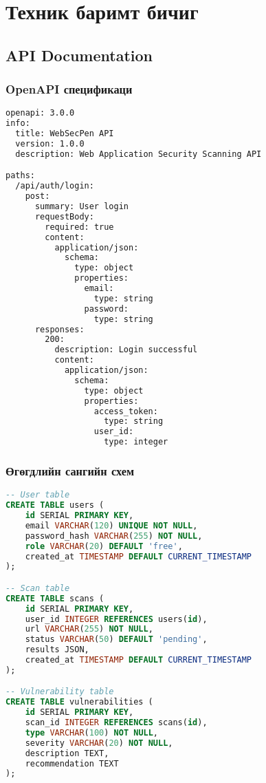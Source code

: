 \documentclass[main.tex]{subfiles}
\begin{document}
\chapter{Техник баримт бичиг}

\section{API Documentation}

\subsection{OpenAPI спецификаци}

\begin{lstlisting}[language=bash, caption=WebSecPen API спецификаци]
openapi: 3.0.0
info:
  title: WebSecPen API
  version: 1.0.0
  description: Web Application Security Scanning API

paths:
  /api/auth/login:
    post:
      summary: User login
      requestBody:
        required: true
        content:
          application/json:
            schema:
              type: object
              properties:
                email:
                  type: string
                password:
                  type: string
      responses:
        200:
          description: Login successful
          content:
            application/json:
              schema:
                type: object
                properties:
                  access_token:
                    type: string
                  user_id:
                    type: integer
\end{lstlisting}

\subsection{Өгөгдлийн сангийн схем}

\begin{lstlisting}[language=SQL, caption=PostgreSQL өгөгдлийн сангийн схем]
-- User table
CREATE TABLE users (
    id SERIAL PRIMARY KEY,
    email VARCHAR(120) UNIQUE NOT NULL,
    password_hash VARCHAR(255) NOT NULL,
    role VARCHAR(20) DEFAULT 'free',
    created_at TIMESTAMP DEFAULT CURRENT_TIMESTAMP
);

-- Scan table  
CREATE TABLE scans (
    id SERIAL PRIMARY KEY,
    user_id INTEGER REFERENCES users(id),
    url VARCHAR(255) NOT NULL,
    status VARCHAR(50) DEFAULT 'pending',
    results JSON,
    created_at TIMESTAMP DEFAULT CURRENT_TIMESTAMP
);

-- Vulnerability table
CREATE TABLE vulnerabilities (
    id SERIAL PRIMARY KEY,
    scan_id INTEGER REFERENCES scans(id),
    type VARCHAR(100) NOT NULL,
    severity VARCHAR(20) NOT NULL,
    description TEXT,
    recommendation TEXT
);
\end{lstlisting}
\end{document}
